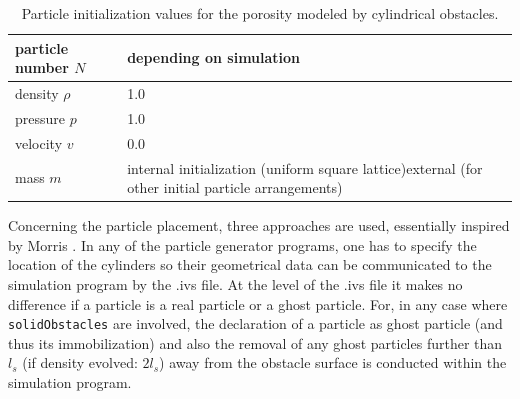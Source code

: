 \documentclass[11pt,a4paper,twoside]{report}
\begin{document}
\begin{table}[h] %
\label{tab:InitPartValues_Porosities}
\centering

\begin{tabular}[c]{|l|p{5cm}|} %
\hline
\hline
particle number $N$ &  depending on simulation\\
\hline
density $\rho$ &  1.0\\
\hline
pressure $p$ &  1.0 \\
\hline
velocity $v$ & 0.0\\
\hline
mass $m$ & internal initialization (uniform square lattice)\newline external (for other initial particle arrangements)\\
\hline
\hline
\end{tabular}
\caption[]{Particle initialization values for the porosity modeled by cylindrical obstacles.}

\end{table}


Concerning the particle placement, three approaches are used, essentially inspired by Morris \cite{Morris1997, Zhu1999}. In any of the particle generator programs, one has to specify the location of the cylinders so their geometrical data can be communicated to the simulation program by the .ivs file. At the level of the .ivs file it makes no difference if a particle is a real particle or a ghost particle. For, in any case where {\tt solidObstacles} are involved, the declaration of a particle as ghost particle (and thus its immobilization) and also the removal of any ghost particles further than $l_s$ (if density evolved: $2l_s$) away from the obstacle surface is conducted within the simulation program. 
\end{document}
